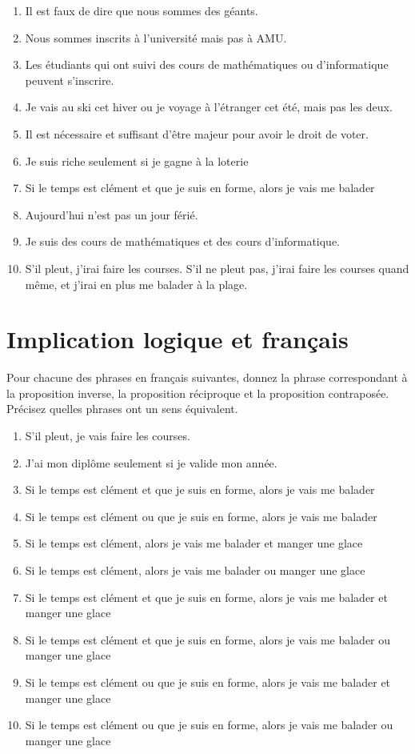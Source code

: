 \documentclass[a4paper,11pt]{article}
\begin{document}
\begin{enumerate}
\item Il est faux de dire que nous sommes des géants.
\item Nous sommes inscrits à l'université mais pas à AMU.
\item Les étudiants qui ont suivi des cours de mathématiques ou d'informatique peuvent s'inscrire.
\item Je vais au ski cet hiver ou je voyage à l'étranger cet été, mais pas les deux.
\item Il est nécessaire et suffisant d'être majeur pour avoir le droit de voter.
\item Je suis riche seulement si je gagne à la loterie
\item Si le temps est clément et que je suis en forme, alors je vais me balader
\item Aujourd'hui n'est pas un jour férié.
\item Je suis des cours de mathématiques et des cours d'informatique.
\item S'il pleut, j'irai faire les courses. S'il ne pleut pas, j'irai faire les courses quand même, et j'irai en plus me balader à la plage.
\end{enumerate}

\section{Implication logique et français}

Pour chacune des phrases en français suivantes, donnez la phrase correspondant à la proposition inverse, la proposition réciproque et la proposition contraposée. Précisez quelles phrases ont un sens équivalent.

\begin{enumerate}
\item S'il pleut, je vais faire les courses.
\item J'ai mon diplôme seulement si je valide mon année.
\item Si le temps est clément et que je suis en forme, alors je vais me balader
\item Si le temps est clément ou que je suis en forme, alors je vais me balader
\item Si le temps est clément, alors je vais me balader et manger une glace
\item Si le temps est clément, alors je vais me balader ou manger une glace
\item Si le temps est clément et que je suis en forme, alors je vais me balader et manger une glace
\item Si le temps est clément et que je suis en forme, alors je vais me balader ou manger une glace
\item Si le temps est clément ou que je suis en forme, alors je vais me balader et manger une glace
\item Si le temps est clément ou que je suis en forme, alors je vais me balader ou manger une glace
\end{enumerate}
\end{document}
